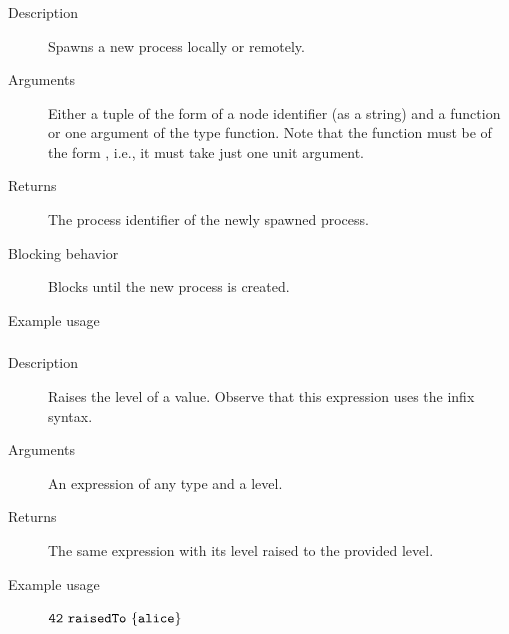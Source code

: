 \subsubsection{}
\begin{description}
    \item [Description] Spawns a new process locally or remotely.  
    \item [Arguments] Either a tuple of the form  of a node identifier (as a string) and a function 
or one argument of the type function. 
Note that the function must be of the form , i.e., it must take just one unit argument.
    \item [Returns] The process identifier of the newly spawned process.
    \item [Blocking behavior] Blocks until the new process is created.
    \item [Example usage] 

\end{description}

\subsubsection{}
\begin{description}
    \item [Description] Raises the level of a value. Observe that this expression uses the infix syntax.
    \item [Arguments] An expression of any type and a level.
    \item [Returns] The same expression with its level raised to the provided level.
    \item [Example usage] ${\mathtt{42\ raisedTo\ \{alice\}}}$
\end{description}


\subsubsection{}

